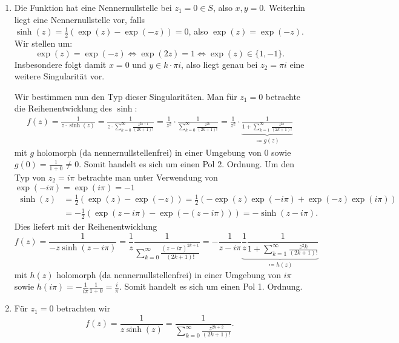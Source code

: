 \documentclass[a4paper]{article}
\begin{document}
\begin{enumerate}
	\item 
	Die Funktion hat eine Nennernullstelle bei $z_1 = 0 \in S$, also $x,y = 0$.
	Weiterhin liegt eine Nennernullstelle vor, falls $\sinh(z) = \frac{1}{2} (\exp(z) - \exp(-z)) = 0$, also $\exp(z) = \exp(-z)$.
	Wir stellen um:
	\begin{equation*}
		\exp(z) = \exp(-z) \iff \exp(2z) = 1 \iff \exp(z) \in \{1, -1\}\text{.}
	\end{equation*}
	Insbesondere folgt damit $x = 0$ und $y \in k \cdot \pi i$, also liegt genau bei $z_2 = \pi i$ eine weitere Singularität vor.
	
	Wir bestimmen nun den Typ dieser Singularitäten.
	Man für $z_1 = 0$ betrachte die Reihenentwicklung des $\sinh$:
	\begin{align*}
		f(z) = \frac{1}{z \cdot \sinh(z)} = \frac{1}{z \cdot \sum_{k = 0}^{\infty} \frac{z^{2k+1}}{(2k+1)!}} = \frac{1}{z^2} \cdot \frac{1}{\sum_{k = 0}^{\infty} \frac{z^{2k}}{(2k+1)!}} = \frac{1}{z^2} \cdot \underbrace{\frac{1}{1 + \sum_{k = 1}^{\infty} \frac{z^{2k}}{(2k+1)!}}}_{\coloneq g(z)} 
	\end{align*}
	mit $g$ holomorph (da nennernullstellenfrei) in einer Umgebung von $0$ sowie $g(0) = \frac{1}{1 + 0} \neq 0$. Somit handelt es sich um einen Pol 2. Ordnung.
	Um den Typ von $z_2 = i \pi$ betrachte man unter Verwendung von $\exp(-i \pi) = \exp(i \pi) = -1$
	\begin{align*}
		\sinh(z) &= \frac{1}{2} (\exp(z) - \exp(-z)) = \frac{1}{2} (-\exp(z)\exp(-i \pi) + \exp(-z) \exp(i \pi))\\ &= - \frac{1}{2} (\exp(z - i \pi) - \exp(-(z - i \pi))) = - \sinh(z - i \pi)\text{.} 
	\end{align*}
	Dies liefert mit der Reihenentwicklung
	\begin{equation*}
		f(z) = \frac{1}{-z \sinh(z - i \pi)} = \frac{1}{z} \frac{1}{\sum_{k=0}^{\infty} \frac{(z-i \pi)^{2k+1}}{(2k + 1)!}} = -\frac{1}{z-i\pi} \underbrace{\frac{1}{z} \frac{1}{1 + \sum_{k =1}^{\infty} \frac{z^2k}{(2k + 1)!}}}_{\coloneq h(z)}
	\end{equation*}
	mit $h(z)$ holomorph (da nennernullstellenfrei) in einer Umgebung von $i \pi$ sowie $h(i \pi) = -\frac{1}{i \pi} \frac{1}{1 + 0} = \frac{i}{\pi}$.
	Somit handelt es sich um einen Pol 1. Ordnung.
	\item 
	Für $z_1 = 0$ betrachten wir
	\begin{equation*}
		f(z) = \frac{1}{z \sinh(z)} = \frac{1}{\sum_{k = 0}^{\infty} \frac{z^{2k+2}}{(2k+1)!}}\text{.}

\end{equation*}
\end{enumerate}
\end{document}

